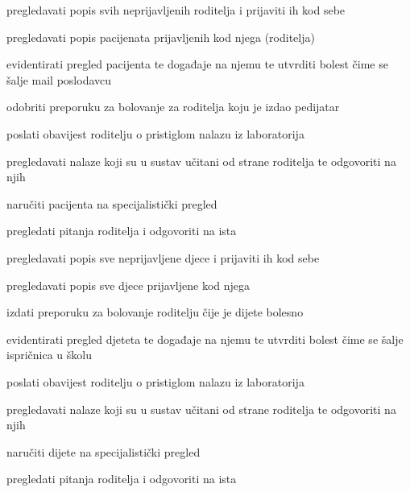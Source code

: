 \begin{packed_enum}
\begin{packed_enum}
					\item pregledavati popis svih neprijavljenih roditelja i prijaviti ih kod sebe
					\item pregledavati popis pacijenata prijavljenih kod njega (roditelja)
					\item evidentirati pregled pacijenta te događaje na njemu te utvrditi bolest čime se šalje mail poslodavcu
					\item odobriti preporuku za bolovanje za roditelja koju je izdao pedijatar
					\item poslati obavijest roditelju o pristiglom nalazu iz laboratorija
					\item pregledavati nalaze koji su u sustav učitani od strane roditelja te odgovoriti na njih
					\item naručiti pacijenta na specijalistički pregled
					\item pregledati pitanja roditelja i odgovoriti na ista
				\end{packed_enum}
				
				\item  {}
				
				\begin{packed_enum}
					
					\item pregledavati popis sve neprijavljene djece i prijaviti ih kod sebe
					\item pregledavati popis sve djece prijavljene kod njega
					\item izdati preporuku za bolovanje roditelju čije je dijete bolesno
					\item evidentirati pregled djeteta te događaje na njemu te utvrditi bolest čime se šalje ispričnica u školu
					\item poslati obavijest roditelju o pristiglom nalazu iz laboratorija
					\item pregledavati nalaze koji su u sustav učitani od strane roditelja te odgovoriti na njih
					\item naručiti dijete na specijalistički pregled
					\item pregledati pitanja roditelja i odgovoriti na ista
					
				\end{packed_enum}
				
				\item  {}
				
				\begin{packed_enum}
					

\end{packed_enum}
\end{packed_enum}
